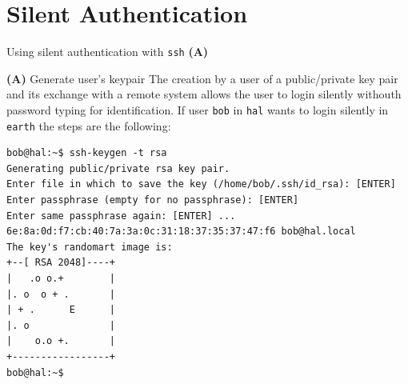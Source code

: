 \section{Silent Authentication}
\begin{frame}[t,fragile]{Using silent authentication with \alert{\texttt{ssh}} \textbf{(A)}}
  \vspace{-0.2cm}
  \begin{block}{\textbf{(A)} Generate user's keypair}
    {\footnotesize The creation by a user of a public/private key pair and its exchange
with a remote system allows the user to login silently withouth
password typing for identification. If user \texttt{bob} in \texttt{hal} wants to login silently in \texttt{earth} the steps are the following:}

{\scriptsize
  \begin{lstlisting}
bob@hal:~$ ssh-keygen -t rsa
Generating public/private rsa key pair.
Enter file in which to save the key (/home/bob/.ssh/id_rsa): [ENTER]
Enter passphrase (empty for no passphrase): [ENTER]
Enter same passphrase again: [ENTER] ...
6e:8a:0d:f7:cb:40:7a:3a:0c:31:18:37:35:37:47:f6 bob@hal.local
The key's randomart image is:
+--[ RSA 2048]----+
|   .o o.+        |
|. o  o + .       |
| + .      E      |
|. o              |
|    o.o +.       |
+-----------------+
bob@hal:~$ 
  \end{lstlisting}
}


  \end{block}
  
\end{frame}
